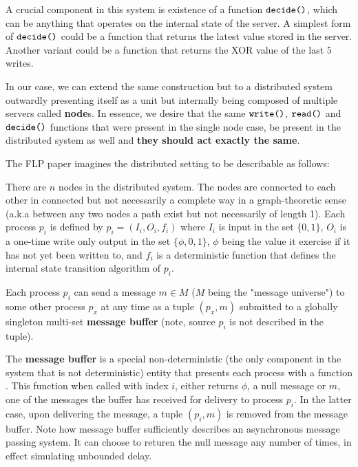 A crucial component in this system is existence of a function $\verb|decide()|$, which can be anything that operates on the internal state of the server. A simplest form of $\verb|decide()|$ could be a function that returns the latest value stored in the server. Another variant could be a function that returns the XOR value of the last $5$ writes.

In our case, we can extend the same construction but to a distributed system outwardly presenting itself as a unit but internally being composed of multiple servers called \textbf{node}s. In essence, we desire that the same $\verb|write()|$, $\verb|read()|$ and $\verb|decide()|$ functions that were present in the single node case, be present in the distributed system as well and \textbf{they should act exactly the same}.

The FLP paper imagines the distributed setting to be describable as follows:

There are $n$ nodes in the distributed system. The nodes are connected to each other in connected but not necessarily a complete way in a graph-theoretic sense (a.k.a between any two nodes a path exist but not necessarily of length 1). Each process $p_i$ is defined by $p_i = (I_i, O_i, f_i)$ where $I_i$ is input in the set $\{0, 1\}$, $O_i$ is a one-time write only output in the set $\{\phi, 0, 1\}$, $\phi$ being the value it exercise if it has not yet been written to, and $f_i$ is a deterministic function that defines the internal state transition algorithm of $p_i$.

Each process $p_i$ can send a message $m \in M$ ($M$ being the "message universe") to some other process $p_x$ at any time as a tuple $(p_x, m)$ submitted to a globally singleton multi-set \textbf{message buffer} (note, source $p_i$ is not described in the tuple).

The \textbf{message buffer} is a special non-deterministic (the only component in the system that is not deterministic) entity that presents each process with a function . This function when called with index $i$, either returns $\phi$, a null message or $m$, one of the messages the buffer has received for delivery to process $p_i$. In the latter case, upon delivering the message, a tuple $(p_i, m)$ is removed from the message buffer. Note how message buffer sufficiently describes an asynchronous message passing system. It can choose to returen the null message any number of times, in effect simulating unbounded delay.

